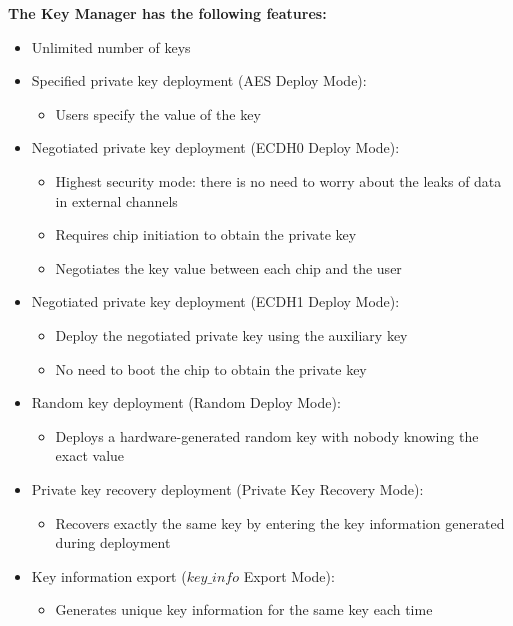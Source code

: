 \documentclass[main\_\_EN.tex]{subfiles}
\begin{document}
\textbf{The Key Manager has the following features:}
\begin{itemize}
    \item Unlimited number of keys
    \item Specified private key deployment (AES Deploy Mode):
    \begin{itemize}
        \item Users specify the value of the key
    \end{itemize}
    \item Negotiated private key deployment (ECDH0 Deploy Mode):
    \begin{itemize}
        \item Highest security mode: there is no need to worry about the leaks of data in external channels
        \item Requires chip initiation to obtain the private key
        \item Negotiates the key value between each chip and the user
    \end{itemize}
    \item Negotiated private key deployment (ECDH1 Deploy Mode):
    \begin{itemize}
        \item Deploy the negotiated private key using the auxiliary key
        \item No need to boot the chip to obtain the private key
    \end{itemize}
    \item Random key deployment (Random Deploy Mode):
    \begin{itemize}
        \item Deploys a hardware-generated random key with nobody knowing the exact value
    \end{itemize}
    \item Private key recovery deployment (Private Key Recovery Mode):
    \begin{itemize}
        \item Recovers exactly the same key by entering the key information generated during deployment
    \end{itemize}
    \item Key information export (\hyperref[para:keyinfo]{\begin{math}key\_info\end{math}} Export Mode):
    \begin{itemize}
        \item Generates unique key information for the same key each time
    \end{itemize}
\end{itemize}
\end{document}
